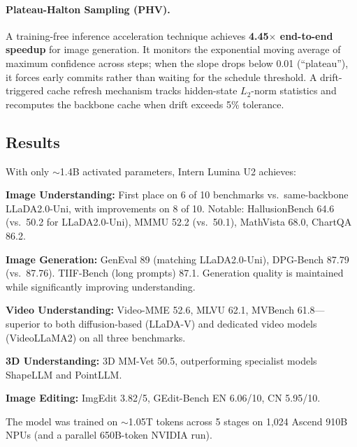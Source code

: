 \documentclass[11pt,a4paper]{article}
\begin{document}
\paragraph{Plateau-Halton Sampling (PHV).}
A training-free inference acceleration technique achieves \textbf{4.45$\times$ end-to-end speedup} for image generation. It monitors the exponential moving average of maximum confidence across steps; when the slope drops below 0.01 (``plateau''), it forces early commits rather than waiting for the schedule threshold. A drift-triggered cache refresh mechanism tracks hidden-state $L_2$-norm statistics and recomputes the backbone cache when drift exceeds 5\% tolerance.

\subsection{Results}
With only $\sim$1.4B activated parameters, Intern Lumina U2 achieves:

\textbf{Image Understanding:} First place on 6 of 10 benchmarks vs.\ same-backbone LLaDA2.0-Uni, with improvements on 8 of 10. Notable: HallusionBench 64.6 (vs.\ 50.2 for LLaDA2.0-Uni), MMMU 52.2 (vs.\ 50.1), MathVista 68.0, ChartQA 86.2.

\textbf{Image Generation:} GenEval 89 (matching LLaDA2.0-Uni), DPG-Bench 87.79 (vs.\ 87.76). TIIF-Bench (long prompts) 87.1. Generation quality is maintained while significantly improving understanding.

\textbf{Video Understanding:} Video-MME 52.6, MLVU 62.1, MVBench 61.8---superior to both diffusion-based (LLaDA-V) and dedicated video models (VideoLLaMA2) on all three benchmarks.

\textbf{3D Understanding:} 3D MM-Vet 50.5, outperforming specialist models ShapeLLM and PointLLM.

\textbf{Image Editing:} ImgEdit 3.82/5, GEdit-Bench EN 6.06/10, CN 5.95/10.

The model was trained on $\sim$1.05T tokens across 5 stages on 1,024 Ascend 910B NPUs (and a parallel 650B-token NVIDIA run).
\end{document}
